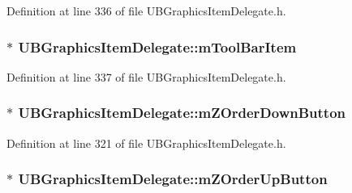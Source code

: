 Definition at line 336 of file U\-B\-Graphics\-Item\-Delegate.\-h.

\hypertarget{class_u_b_graphics_item_delegate_adf8972176c6e60c4a78e90eee2f97540}{
\subsubsection[{m\-Tool\-Bar\-Item}]{$\ast$ U\-B\-Graphics\-Item\-Delegate\-::m\-Tool\-Bar\-Item\hspace{0.3cm}{\ttfamily [protected]}}}\label{dd/dd5/class_u_b_graphics_item_delegate_adf8972176c6e60c4a78e90eee2f97540}


Definition at line 337 of file U\-B\-Graphics\-Item\-Delegate.\-h.

\hypertarget{class_u_b_graphics_item_delegate_a70d87a6726bcd84a212f61856d895192}{
\subsubsection[{m\-Z\-Order\-Down\-Button}]{$\ast$ U\-B\-Graphics\-Item\-Delegate\-::m\-Z\-Order\-Down\-Button\hspace{0.3cm}{\ttfamily [protected]}}}\label{dd/dd5/class_u_b_graphics_item_delegate_a70d87a6726bcd84a212f61856d895192}


Definition at line 321 of file U\-B\-Graphics\-Item\-Delegate.\-h.

\hypertarget{class_u_b_graphics_item_delegate_ae4a5db7a8e39d892bb606bf251eb653c}{
\subsubsection[{m\-Z\-Order\-Up\-Button}]{$\ast$ U\-B\-Graphics\-Item\-Delegate\-::m\-Z\-Order\-Up\-Button\hspace{0.3cm}{\ttfamily [protected]}}}\label{dd/dd5/class_u_b_graphics_item_delegate_ae4a5db7a8e39d892bb606bf251eb653c}


